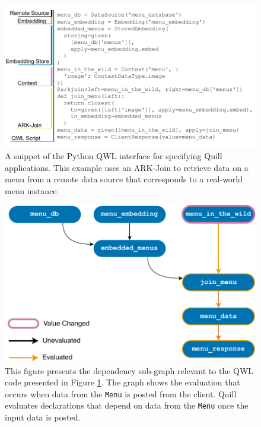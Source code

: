 \documentclass[11pt]{article}
\begin{document}
\begin{figure}
    \centering
    \includegraphics[width=0.7\linewidth,]{figs/annotated_qql_large.pdf}
    \caption{A snippet of the Python QWL interface for specifying Quill applications. This example uses an ARK-Join to retrieve data on a menu from a remote data source that corresponds to a real-world menu instance. 
    }
    \label{fig:qql-breakdown}
\end{figure}

\begin{figure}[t]
    \centering
    \includegraphics[width=0.6\linewidth]{figs/qql-dependency.pdf}
    \caption{This figure presents the dependency sub-graph relevant to the QWL code presented in Figure \ref{fig:qql-breakdown}.
    The graph shows the evaluation that occurs when data from the \texttt{Menu} is posted  from the client. Quill evaluates declarations that depend on data from the \texttt{Menu} once the input data is posted.}
    \label{fig:dependency}
\end{figure}
\end{document}
